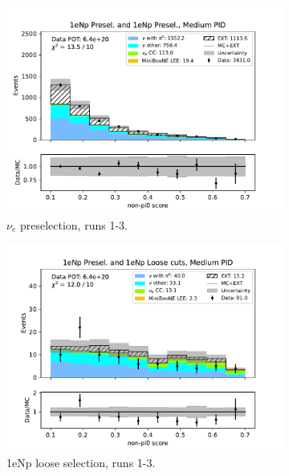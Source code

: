 \begin{figure}[H]
    \centering
    \begin{subfigure}{0.5\linewidth}
        \includegraphics[width=\linewidth]{technote/Sidebands/Figures/NearSideband/near_sideband_nonpi0_score_run123_NP_NP_MEDIUM_PID.pdf}
        \caption{$\nu_e$ preselection, runs 1-3.}
    \end{subfigure}%
    \begin{subfigure}{0.5\linewidth}
        \includegraphics[width=\linewidth]{technote/Sidebands/Figures/NearSideband/near_sideband_nonpi0_score_run123_NP_NPL_MEDIUM_PID.pdf}
        \caption{1eNp loose selection, runs 1-3.}
    \end{subfigure}
    \begin{subfigure}{0.5\linewidth}

\end{subfigure}
\end{figure}
